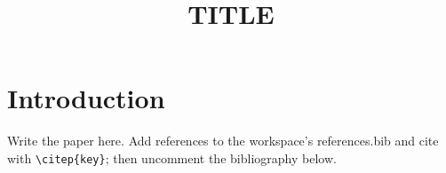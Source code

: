 \documentclass{article}
\title{{{TITLE}}}
\author{}
\date{}
\begin{document}
\maketitle
\section{Introduction}
Write the paper here. Add references to the workspace's references.bib and cite
with \verb|\citep{key}|; then uncomment the bibliography below.

% 
\end{document}
